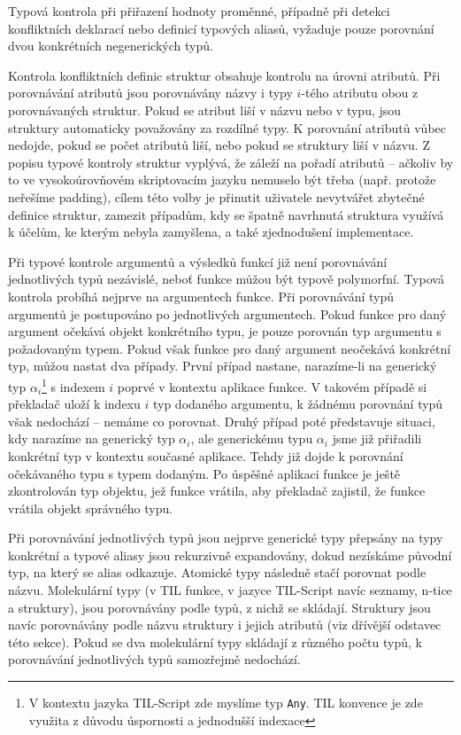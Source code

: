 Typová kontrola při přiřazení hodnoty proměnné, případně při detekci konfliktních deklarací nebo
definicí typových aliasů, vyžaduje pouze porovnání dvou konkrétních negenerických typů.

Kontrola konfliktních definic struktur obsahuje kontrolu na úrovni atributů. Při porovnávání
atributů jsou porovnávány názvy i typy $i$-tého atributu obou z porovnávaných struktur. Pokud se
atribut liší v názvu nebo v typu, jsou struktury automaticky považovány za rozdílné typy.
K porovnání atributů vůbec nedojde, pokud se počet atributů liší, nebo pokud se struktury liší
v názvu. Z popisu typové kontroly struktur vyplývá, že záleží na pořadí atributů -- ačkoliv by to
ve vysokoúrovňovém skriptovacím jazyku nemuselo být třeba (např. protože neřešíme padding), cílem
této volby je přinutit uživatele nevytvářet zbytečné definice struktur, zamezit případům, kdy
se špatně navrhnutá struktura využívá k účelům, ke kterým nebyla zamyšlena, a také zjednodušení
implementace.

Při typové kontrole argumentů a výsledků funkcí již není porovnávání jednotlivých typů nezávislé,
neboť funkce můžou být typově polymorfní. Typová kontrola probíhá nejprve na argumentech funkce.
Při porovnávání typů argumentů je postupováno po jednotlivých argumentech. Pokud funkce pro daný
argument očekává objekt konkrétního typu, je pouze porovnán typ argumentu s požadovaným typem.
Pokud však funkce pro daný argument neočekává konkrétní typ, můžou nastat dva případy. První případ
nastane, narazíme-li na generický typ $\alpha_{i}$\footnote{V kontextu jazyka TIL-Script zde myslíme typ
  \lstinline{Any}. TIL konvence je zde využita z důvodu úspornosti a jednodušší
  indexace} s indexem $i$ poprvé v kontextu aplikace funkce. V takovém případě si překladač uloží
k indexu $i$ typ dodaného argumentu, k žádnému porovnání typů však nedochází -- nemáme co porovnat.
Druhý případ poté představuje situaci, kdy narazíme na generický typ $\alpha_{i}$, ale generickému typu
$\alpha_{i}$ jsme již přiřadili konkrétní typ v kontextu současné aplikace. Tehdy již dojde k porovnání
očekávaného typu s typem dodaným. Po úspěšné aplikaci funkce je ještě zkontrolován typ objektu, jež
funkce vrátila, aby překladač zajistil, že funkce vrátila objekt správného typu.

Při porovnávání jednotlivých typů jsou nejprve generické typy přepsány na typy konkrétní a typové
aliasy jsou rekurzivně expandovány, dokud nezískáme původní typ, na který se alias odkazuje.
Atomické typy následně stačí porovnat podle názvu. Molekulární typy (v TIL funkce, v jazyce
TIL-Script navíc seznamy, n-tice a struktury), jsou porovnávány podle typů, z nichž se skládají.
Struktury jsou navíc porovnávány podle názvu struktury i jejich atributů (viz dřívější odstavec této
sekce). Pokud se dva molekulární typy skládají z různého počtu typů, k porovnávání jednotlivých typů
samozřejmě nedochází.

